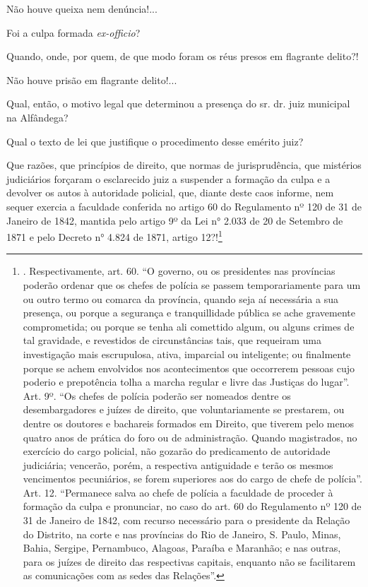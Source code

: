 Não houve queixa nem denúncia!...

Foi a culpa formada \emph{ex-officio}?

Quando, onde, por quem, de que modo foram os réus presos em flagrante
delito?!

Não houve prisão em flagrante delito!...

Qual, então, o motivo legal que determinou a presença do sr. dr. juiz
municipal na Alfândega?

Qual o texto de lei que justifique o procedimento desse emérito juiz?

Que razões, que princípios de direito, que normas de jurisprudência, que
mistérios judiciários forçaram o esclarecido juiz a suspender a formação
da culpa e a devolver os autos à autoridade policial, que, diante deste
caos informe, nem sequer exercia a faculdade conferida no artigo 60 do
Regulamento nº 120 de 31 de Janeiro de 1842, mantida pelo artigo 9º da
Lei n° 2.033 de 20 de Setembro de 1871 e pelo Decreto n° 4.824 de 1871,
artigo 12?!\footnote{. Respectivamente, art. 60. ``O governo, ou os
  presidentes nas províncias poderão ordenar que os chefes de polícia se
  passem temporariamente para um ou outro termo ou comarca da província,
  quando seja aí necessária a sua presença, ou porque a segurança e
  tranquillidade pública se ache gravemente comprometida; ou porque se
  tenha ali comettido algum, ou alguns crimes de tal gravidade, e
  revestidos de circunstâncias tais, que requeiram uma investigação mais
  escrupulosa, ativa, imparcial ou inteligente; ou finalmente porque se
  achem envolvidos nos acontecimentos que occorrerem pessoas cujo
  poderio e prepotência tolha a marcha regular e livre das Justiças do
  lugar''. Art. 9º. ``Os chefes de polícia poderão ser nomeados dentre
  os desembargadores e juízes de direito, que voluntariamente se
  prestarem, ou dentre os doutores e bachareis formados em Direito, que
  tiverem pelo menos quatro anos de prática do foro ou de administração.
  Quando magistrados, no exercício do cargo policial, não gozarão do
  predicamento de autoridade judiciária; vencerão, porém, a respectiva
  antiguidade e terão os mesmos vencimentos pecuniários, se forem
  superiores aos do cargo de chefe de polícia''. Art. 12. ``Permanece
  salva ao chefe de polícia a faculdade de proceder à formação da culpa
  e pronunciar, no caso do art. 60 do Regulamento nº 120 de 31 de
  Janeiro de 1842, com recurso necessário para o presidente da Relação
  do Distrito, na corte e nas províncias do Rio de Janeiro, S. Paulo,
  Minas, Bahia, Sergipe, Pernambuco, Alagoas, Paraíba e Maranhão; e nas
  outras, para os juízes de direito das respectivas capitais, enquanto
  não se facilitarem as comunicações com as sedes das Relações''.}

